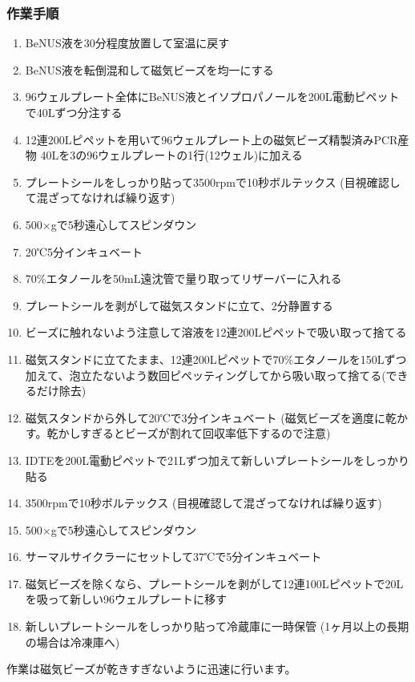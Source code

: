 \documentclass[titlepage,10pt,a4paper,uplatex]{jsbook}
\begin{document}
\subsubsection{作業手順}
\begin{enumerate}
\item BeNUS液を30分程度放置して室温に戻す
\item BeNUS液を転倒混和して磁気ビーズを均一にする
\item 96ウェルプレート全体にBeNUS液とイソプロパノールを200{\textmu}L電動ピペットで40{\textmu}Lずつ分注する
\item 12連200{\textmu}Lピペットを用いて96ウェルプレート上の磁気ビーズ精製済みPCR産物 40{\textmu}Lを3の96ウェルプレートの1行(12ウェル)に加える
\item プレートシールをしっかり貼って3500rpmで10秒ボルテックス (目視確認して混ざってなければ繰り返す)
\item 500×gで5秒遠心してスピンダウン
\item 20℃5分インキュベート
\item 70\%エタノールを50mL遠沈管で量り取ってリザーバーに入れる
\item プレートシールを剥がして磁気スタンドに立て、2分静置する
\item ビーズに触れないよう注意して溶液を12連200{\textmu}Lピペットで吸い取って捨てる
\item 磁気スタンドに立てたまま、12連200{\textmu}Lピペットで70\%エタノールを150{\textmu}Lずつ加えて、泡立たないよう数回ピペッティングしてから吸い取って捨てる(できるだけ除去)
\item 磁気スタンドから外して20℃で3分インキュベート (磁気ビーズを適度に乾かす。乾かしすぎるとビーズが割れて回収率低下するので注意)
\item IDTEを200{\textmu}L電動ピペットで21{\textmu}Lずつ加えて新しいプレートシールをしっかり貼る
\item 3500rpmで10秒ボルテックス (目視確認して混ざってなければ繰り返す)
\item 500×gで5秒遠心してスピンダウン
\item サーマルサイクラーにセットして37℃で5分インキュベート
\item 磁気ビーズを除くなら、プレートシールを剥がして12連100{\textmu}Lピペットで20{\textmu}Lを吸って新しい96ウェルプレートに移す
\item 新しいプレートシールをしっかり貼って冷蔵庫に一時保管 (1ヶ月以上の長期の場合は冷凍庫へ)
\end{enumerate}

作業は磁気ビーズが乾きすぎないように迅速に行います。
\end{document}

